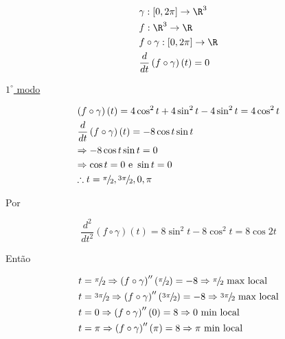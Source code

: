 \documentclass[11pt, oneside, a4paper]{gsm-l}
\begin{document}
\begin{enumerate}
\begin{sol}
\begin{enumerate}[(a)]
\[
\begin{gathered}
  \gamma :\left[ {0,2\pi } \right] \to \R^3  \hfill \\
  f:\R^3  \to \R \hfill \\
  f \circ \gamma :\left[ {0,2\pi } \right] \to \R \hfill \\
  \frac{d}
{{dt}}\left( {f \circ \gamma } \right)\left( t \right) = 0 \hfill \\
\end{gathered}
\]

\uline{$1^\circ$ modo}

\[
\begin{gathered}
  \left( {f \circ \gamma } \right)\left( t \right) = 4\cos ^2 t + 4\sin ^2 t - 4\sin ^2 t = 4\cos ^2 t \hfill \\
  \frac{d}
{{dt}}\left( {f \circ \gamma } \right)\left( t \right) =  - 8\cos t\sin t \hfill \\
   \Rightarrow  - 8\cos t\sin t = 0 \hfill \\
   \Rightarrow \cos t = 0{\text{ e }}\sin t = 0 \hfill \\
  \therefore t = {\raise0.5ex\hbox{$\scriptstyle \pi $}
\kern-0.1em/\kern-0.15em
\lower0.25ex\hbox{$\scriptstyle 2$}},{\raise0.5ex\hbox{$\scriptstyle {3\pi }$}
\kern-0.1em/\kern-0.15em
\lower0.25ex\hbox{$\scriptstyle 2$}},0,\pi  \hfill \\
\end{gathered}
\]

Por

\[
\frac{{d^2 }}
{{dt^2 }}\left( {f \circ \gamma } \right)\left( t \right) = 8\sin ^2 t - 8\cos ^2 t = 8\cos 2t
\]

Então

\[
\begin{gathered}
  t = {\raise0.5ex\hbox{$\scriptstyle \pi $}
\kern-0.1em/\kern-0.15em
\lower0.25ex\hbox{$\scriptstyle 2$}} \Rightarrow \left( {f \circ \gamma } \right)''\left( {{\raise0.5ex\hbox{$\scriptstyle \pi $}
\kern-0.1em/\kern-0.15em
\lower0.25ex\hbox{$\scriptstyle 2$}}} \right) =  - 8 \Rightarrow {\raise0.5ex\hbox{$\scriptstyle \pi $}
\kern-0.1em/\kern-0.15em
\lower0.25ex\hbox{$\scriptstyle 2$}}{\text{ max local}} \hfill \\
  t = {\raise0.5ex\hbox{$\scriptstyle {3\pi }$}
\kern-0.1em/\kern-0.15em
\lower0.25ex\hbox{$\scriptstyle 2$}} \Rightarrow \left( {f \circ \gamma } \right)''\left( {{\raise0.5ex\hbox{$\scriptstyle {3\pi }$}
\kern-0.1em/\kern-0.15em
\lower0.25ex\hbox{$\scriptstyle 2$}}} \right) =  - 8 \Rightarrow {\raise0.5ex\hbox{$\scriptstyle {3\pi }$}
\kern-0.1em/\kern-0.15em
\lower0.25ex\hbox{$\scriptstyle 2$}}{\text{ max local}} \hfill \\
  t = 0 \Rightarrow \left( {f \circ \gamma } \right)''\left( 0 \right) = 8 \Rightarrow 0{\text{ min local}} \hfill \\
  t = \pi  \Rightarrow \left( {f \circ \gamma } \right)''\left( \pi  \right) = 8 \Rightarrow \pi {\text{ min local}} \hfill \\
\end{gathered}
\]


\end{enumerate}
\end{sol}
\end{enumerate}
\end{document}
